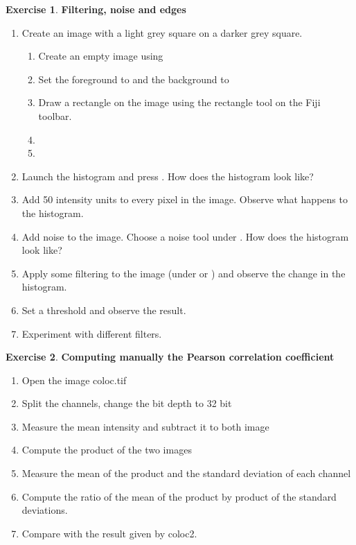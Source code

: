\documentclass[xcolor=table,DIV=19,twocolumn,10pt]{scrartcl}
\theoremstyle{definition}
\newtheorem{exercice}{Exercise}
\begin{document}
\begin{exercice} \textbf{Filtering, noise and edges}
  \begin{enumerate}
     \item Create an image with a light grey square on a darker grey
      square.
      \begin{enumerate}
          \item Create an empty image using 
          \item {} Set the foreground to  and the background to 
          \item Draw a rectangle on the image using the rectangle tool on the Fiji toolbar.
          \item {}
          \item {}
      \end{enumerate}
    \item Launch the histogram and press . How does the histogram look like?
    \item Add 50 intensity units to every pixel in the image.   Observe what happens to the histogram.
    \item Add noise to the image. Choose a noise tool under   . How does the histogram look like?
    \item Apply some filtering to the image (under  or ) and observe the change in the histogram.
    \item Set a threshold and observe the result.
    \item  Experiment with different filters.
  \end{enumerate}
\end{exercice}

\begin{exercice} \textbf{Computing manually the Pearson correlation coefficient}
  \begin{enumerate}
    \item Open the image coloc.tif
    \item Split the channels, change the bit depth to 32 bit
    \item Measure the mean intensity and subtract it to both image
    \item Compute the product of the two images
    \item Measure the mean of the product and the standard deviation of each channel
    \item Compute the ratio of the mean of the product by product of the standard deviations.
    \item Compare with the result given by coloc2.
  \end{enumerate}
\end{exercice}
\end{document}
